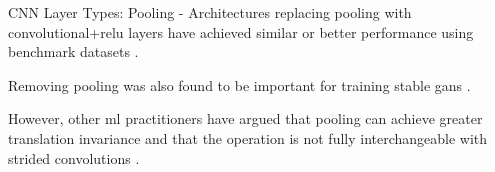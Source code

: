 \begin{frame}[t,allowframebreaks]{CNN Layer Types: Pooling -}
    Architectures replacing \gls{pooling} with 
    convolutional+\gls{relu} layers have achieved similar or better 
    performance using benchmark datasets \cite{Springenberg:2015pl}.\\
    \vspace{0.2cm}

    Removing \gls{pooling} was also found to be important for 
    training stable \glspl{gan} \cite{Radford:2016dcgan}.\\
    \vspace{0.2cm}

    However, other \gls{ml} practitioners have argued that \gls{pooling} can achieve 
    greater translation invariance and that the operation is not
    fully interchangeable with strided convolutions \cite{Aggarwal:2018SpringerDL}.
\end{frame}